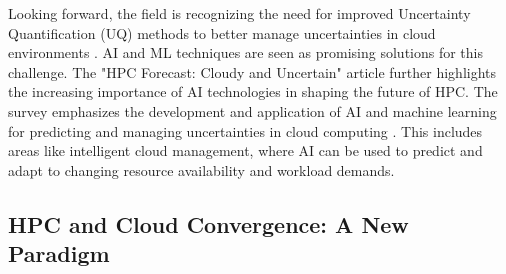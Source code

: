     Looking forward, the field is recognizing the need for improved Uncertainty Quantification (UQ) methods to better manage uncertainties in cloud environments \cite{kabir_uncertainty-aware_2022}. AI and ML techniques are seen as promising solutions for this challenge. The "HPC Forecast: Cloudy and Uncertain" article \cite{reed_hpc_2023} further highlights the increasing importance of AI technologies in shaping the future of HPC. The survey emphasizes the development and application of AI and machine learning for predicting and managing uncertainties in cloud computing \cite{kabir_uncertainty-aware_2022}. This includes areas like intelligent cloud management, where AI can be used to predict and adapt to changing resource availability and workload demands.




\subsection{HPC and Cloud Convergence: A New Paradigm}
\label{subsec:convergence}


